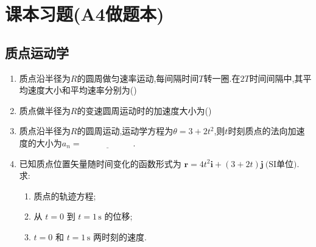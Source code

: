 \section{课本习题(A4做题本)}
\subsection{质点运动学}

\begin{enumerate}
	
	\item[\textbf{1-4}] 质点沿半径为$R$的圆周做匀速率运动,每间隔时间$T$转一圈.在$2T$时间间隔中,其平均速度大小和平均速率分别为(\quad)
	
	
	\vspace{5cm}
	
	\item[\textbf{1-5}] 质点做半径为$R$的变速圆周运动时的加速度大小为(\quad)
	
	
	\vspace{5cm}
	
	\item[\textbf{1-12}] 质点沿半径为$R$的圆周运动,运动学方程为$\theta  = 3 + 2t^2$,则$t$时刻质点的法向加速度的大小为$a_n = \underline{\hspace{6em}}.$
	
	\vspace{5cm}
	
	\item[\textbf{1-18}] 已知质点位置矢量随时间变化的函数形式为
	$\mathbf{r}=4t^2\mathbf{i}+(3+2t)\mathbf{j}\ \text{(SI单位)}.$
	求:
	\begin{enumerate}
		\item 质点的轨迹方程;
		\item 从 \(t=0\) 到 \(t=1\,\text{s}\) 的位移;
		\item \(t=0\) 和 \(t=1\,\text{s}\) 两时刻的速度.
	\end{enumerate}
	

\end{enumerate}
